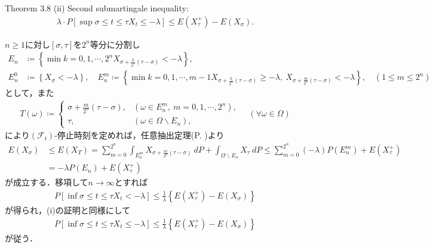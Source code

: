 	\begin{itembox}[l]{Theorem 3.8 (ii)}
		Second submartingale inequality:
		\begin{align}
			\lambda \cdot P\left[ \sup{\sigma \leq t \leq \tau}{X_t} \leq -\lambda \right]
					\leq E(X^+_\tau) - E(X_\sigma).
		\end{align}
	\end{itembox}
	
	\begin{prf}
		$n \geq 1$に対し$[\sigma,\tau]$を$2^n$等分に分割し
		\begin{align}
			E_n &\coloneqq \left\{ \min{k=0,1,\cdots,2^n}{X_{\sigma + \frac{k}{2^n}(\tau - \sigma)} < -\lambda} \right\}, \\
			E_n^0 &\coloneqq \left\{ X_\sigma < -\lambda \right\}, \quad
			E_n^m \coloneqq \left\{ \min{k=0,1,\cdots,m-1}{X_{\sigma + \frac{k}{2^n}(\tau - \sigma)}} \geq -\lambda,\ X_{\sigma + \frac{m}{2^n}(\tau - \sigma)} < -\lambda \right\},
			\quad (1 \leq m \leq 2^n)
		\end{align}
		として，また
		\begin{align}
			T(\omega) \coloneqq
			\begin{cases}
				\sigma + \frac{m}{2^n} (\tau - \sigma), & (\omega \in E_n^m,\ m=0,1,\cdots,2^n),\\
				\tau, & (\omega \in \Omega \backslash E_n),
			\end{cases}
			\quad (\forall \omega \in \Omega)
		\end{align}
		により$(\mathscr{F}_t)$-停止時刻を定めれば，任意抽出定理(P. \pageref{lem:optional_sampling_theorem})より
		\begin{align}
			E(X_\sigma) 
			&\leq E(X_T)
			= \sum_{m=0}^{2^n} \int_{E_n^m} X_{\sigma+\frac{m}{2^n}(\tau-\sigma)}\ dP + \int_{\Omega \backslash E_n} X_\tau\ dP
			\leq \sum_{m=0}^{2^n} (-\lambda) P(E_n^m) + E(X_\tau^+) \\
			&= -\lambda P(E_n) + E(X_\tau^+)
		\end{align}
		が成立する．移項して$n \longrightarrow \infty$とすれば
		\begin{align}
			P\left[ \inf{\sigma \leq t \leq \tau}{X_t} < -\lambda \right]
			\leq \frac{1}{\lambda} \left\{ E(X^+_\tau) - E(X_\sigma) \right\} 
		\end{align}
		が得られ，(i)の証明と同様にして
		\begin{align}
			P\left[ \inf{\sigma \leq t \leq \tau}{X_t} \leq -\lambda \right]
			\leq \frac{1}{\lambda} \left\{ E(X^+_\tau) - E(X_\sigma) \right\}
		\end{align}
		が従う．
		\QED
	\end{prf}
	
